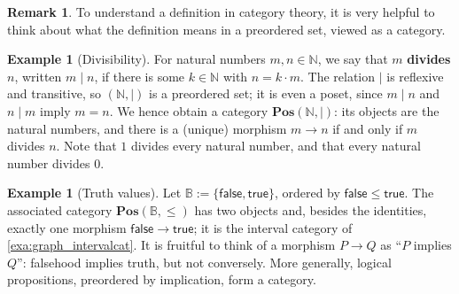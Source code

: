 \documentclass[a4paper,11pt, oneside,titlepage=false]{scrbook}
\theoremstyle{plain}
\theoremstyle{definition}
\newtheorem{rem}[thm]{Remark}
\newtheorem{exa}[thm]{Example}
\newcommand{\Catb}[1]{\mathbf{#1}}
\newcommand{\POS}{\Catb{Pos}}
\newcommand{\NN}{\ensuremath{\mathbb{N}}}
\begin{document}
\begin{rem}
  To understand a definition in category theory, it is very helpful to think about what the definition means in a preordered set, viewed as a category.
\end{rem}

\begin{exa}[Divisibility]\label{exa:divisibility}
  For natural numbers $m, n \in \NN$, we say that $m$ \textbf{divides} $n$,
  written $m \mid n$, if there is some $k \in \NN$ with $n = k \cdot m$.
  The relation $\mid$ is reflexive and transitive, so $(\NN, \mid)$ is a
  preordered set; it is even a poset, since $m \mid n$ and $n \mid m$ imply
  $m = n$.
  We hence obtain a category $\POS(\NN, \mid)$: its objects are the natural
  numbers, and there is a (unique) morphism $m \to n$ if and only if $m$
  divides $n$.
  Note that $1$ divides every natural number, and that every natural number
  divides $0$.
\end{exa}

\begin{exa}[Truth values]\label{exa:truthvalues}
  Let $\mathbb{B} := \{\mathsf{false}, \mathsf{true}\}$, ordered by
  $\mathsf{false} \leq \mathsf{true}$.
  The associated category $\POS(\mathbb{B}, \leq)$ has two objects and, besides
  the identities, exactly one morphism $\mathsf{false} \to \mathsf{true}$;
  it is the interval category of \cref{exa:graph_intervalcat}.
  It is fruitful to think of a morphism $P \to Q$ as ``$P$ implies $Q$'':
  falsehood implies truth, but not conversely.
  More generally, logical propositions, preordered by implication, form a
  category.
\end{exa}
\end{document}

